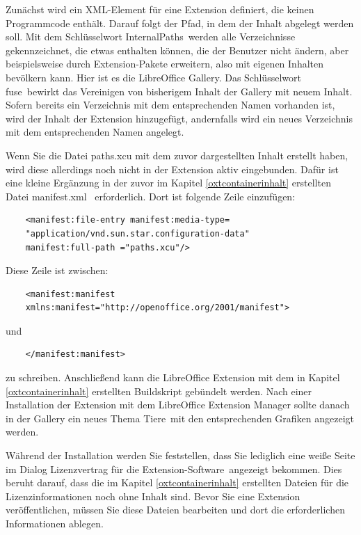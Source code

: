 \documentclass[12pt,a4paper,titlepage]{book}
\begin{document}
Zunächst wird ein XML-Element für eine Extension definiert, die keinen Programmcode enthält. Darauf folgt der Pfad, in dem der Inhalt abgelegt werden soll. Mit dem Schlüsselwort \glqq InternalPaths\grqq~werden alle Verzeichnisse gekennzeichnet, die etwas enthalten können, die der Benutzer nicht ändern, aber beispielsweise durch Extension-Pakete erweitern, also mit eigenen Inhalten bevölkern kann. Hier ist es die LibreOffice Gallery. Das Schlüsselwort \glqq fuse\grqq~bewirkt das Vereinigen von bisherigem Inhalt der Gallery mit neuem Inhalt. Sofern bereits ein Verzeichnis mit dem entsprechenden Namen vorhanden ist, wird der Inhalt der Extension hinzugefügt, andernfalls wird ein neues Verzeichnis mit dem entsprechenden Namen angelegt.

Wenn Sie die Datei paths.xcu mit dem zuvor dargestellten Inhalt erstellt haben, wird diese allerdings noch nicht in der Extension aktiv eingebunden. Dafür ist eine kleine Ergänzung in der zuvor im Kapitel \ref{oxtcontainerinhalt} erstellten Datei \glqq manifest.xml\grqq~ erforderlich. Dort ist folgende Zeile einzufügen:
\begin{lstlisting}
	<manifest:file-entry manifest:media-type=
	"application/vnd.sun.star.configuration-data"  
	manifest:full-path ="paths.xcu"/>
\end{lstlisting}  
Diese Zeile ist zwischen:
\begin{lstlisting}
	<manifest:manifest 
	xmlns:manifest="http://openoffice.org/2001/manifest">
\end{lstlisting}

und

\begin{lstlisting}
	</manifest:manifest>
\end{lstlisting}
zu schreiben. Anschließend kann die LibreOffice Extension mit dem in Kapitel \ref{oxtcontainerinhalt} erstellten Buildskript gebündelt werden. Nach einer Installation der Extension mit dem LibreOffice Extension Manager sollte danach in der Gallery ein neues Thema \glqq Tiere\grqq~mit den entsprechenden Grafiken angezeigt werden.

Während der Installation werden Sie feststellen, dass Sie lediglich eine weiße Seite im Dialog \glqq Lizenzvertrag für die Extension-Software\grqq~angezeigt bekommen. Dies beruht darauf, dass die im Kapitel \ref{oxtcontainerinhalt} erstellten Dateien für die Lizenzinformationen noch ohne Inhalt sind. Bevor Sie eine Extension veröffentlichen, müssen Sie diese Dateien bearbeiten und dort die erforderlichen Informationen ablegen.
\end{document}
